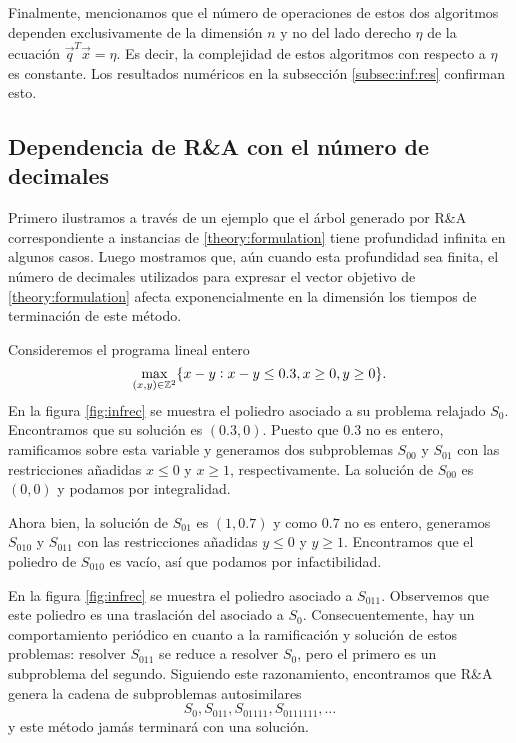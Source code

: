 Finalmente, mencionamos que el número de operaciones de estos dos algoritmos dependen exclusivamente de la
dimensión $n$ y no del lado derecho $\eta$ de la ecuación $\vec{q}^T\vec{x} = \eta$. Es decir, la
complejidad de estos algoritmos con respecto a $\eta$ es constante. Los resultados numéricos en la
subsección \ref{subsec:inf:res} confirman esto.

\subsection{Dependencia de R\&A con el número de decimales}
\label{subsec:inf:int}
\noindent
Primero ilustramos a través de un ejemplo que el árbol generado por R\&A correspondiente a instancias de
\eqref{theory:formulation} tiene profundidad infinita en algunos casos. Luego mostramos que, aún
cuando esta profundidad sea finita, el número de decimales utilizados para expresar el vector
objetivo de \eqref{theory:formulation} afecta exponencialmente en la dimensión los tiempos de
terminación de este método.

\begin{example}
	\label{ex:inf}
	Consideremos el programa lineal entero
	\begin{equation*}
		\max_{(x, y) \in \mathbb{Z}^2}\lbrace x - y \vcentcolon x - y \leq 0.3, x \geq 0, y \geq 0 \rbrace.
	\end{equation*}
	En la figura \ref{fig:infrec} se muestra el poliedro asociado a su problema relajado $S_0$.
	Encontramos que su solución es $(0.3, 0)$. Puesto que $0.3$ no
	es entero, ramificamos sobre esta variable y generamos dos subproblemas $S_{00}$ y $S_{01}$ con
	las restricciones añadidas $x \leq 0$ y $x \geq 1$, respectivamente. La solución de $S_{00}$
	es $(0, 0)$ y podamos por integralidad.

	Ahora bien, la solución de $S_{01}$ es $(1, 0.7)$ y como $0.7$ no es entero, generamos $S_{010}$
	y $S_{011}$ con las restricciones añadidas $y \leq 0$ y $y \geq 1$. Encontramos que el poliedro
	de $S_{010}$ es vacío, así que podamos por infactibilidad.

	En la figura \ref{fig:infrec} se muestra el poliedro asociado a $S_{011}$. Observemos que este poliedro es
	una traslación del asociado a $S_0$. Consecuentemente, hay un comportamiento
	periódico en cuanto a la ramificación y solución de estos problemas: resolver $S_{011}$ se
	reduce a resolver $S_0$, pero el primero es un subproblema del segundo. Siguiendo este
	razonamiento, encontramos que R\&A genera la cadena de subproblemas autosimilares
	\begin{equation*}
		S_0, S_{011}, S_{01111}, S_{0111111}, \ldots
	\end{equation*}
	y este método jamás terminará con una solución.
\end{example}

